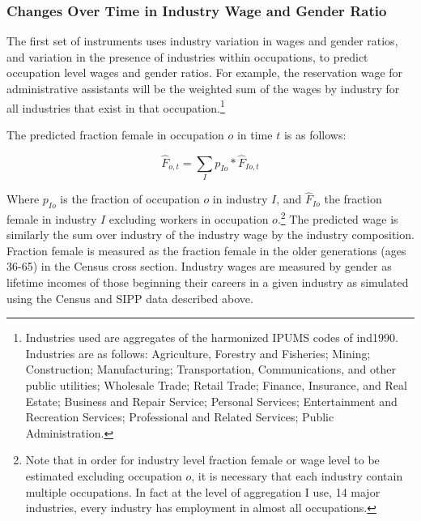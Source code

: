 \documentclass[12pt]{article}
\begin{document}
\subsubsection{Changes Over Time in Industry Wage and Gender Ratio}
The first set of instruments uses industry variation in wages and gender ratios, and variation in the presence of industries within occupations, to predict occupation level wages and gender ratios. For example, the reservation wage for administrative assistants will be the weighted sum of the wages by industry for all industries that exist in that occupation.\footnote{Industries used are aggregates of the harmonized IPUMS codes of ind1990. Industries are as follows: Agriculture, Forestry and Fisheries; Mining; Construction; Manufacturing; Transportation, Communications, and other public utilities; Wholesale Trade; Retail Trade; Finance, Insurance, and Real Estate; Business and Repair Service; Personal Services; Entertainment and Recreation Services; Professional and Related Services; Public Administration.}


The predicted fraction female in occupation $o$ in time $t$ is as follows:

$$\hat{F}_{o,t} = \sum_I  p_{Io}*\hat{F}_{Io,t} $$

Where $p_{Io}$ is the fraction of occupation $o$ in industry $I$, and $\hat{F}_{Io}$ the fraction female in industry $I$ excluding workers in occupation $o$.\footnote{Note that in order for industry level fraction female or wage level to be estimated excluding occupation $o$, it is necessary that each industry contain multiple occupations. In fact at the level of aggregation I use, 14 major industries, every industry has employment in almost all occupations.} The predicted wage is similarly the sum over industry of the industry wage by the industry composition. Fraction female is measured as the fraction female in the older generations (ages 36-65) in the Census cross section. Industry wages are measured by gender as lifetime incomes of those beginning their careers in a given industry as simulated using the Census and SIPP data described above.
\end{document}

